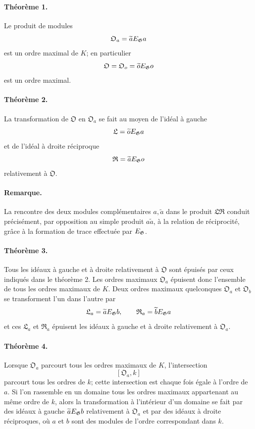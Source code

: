 \paragraph{Théorème 1.}
Le produit de modules
\[
        \mathfrak O_a=\widetilde a E_\mathfrak G a
\]
est un ordre maximal de \(K\); en particulier
\[
        \mathfrak O=\mathfrak O_o=\widetilde oE_\mathfrak G o
\]
est un ordre maximal.

\paragraph{Théorème 2.}
La transformation de \(\mathfrak O\) en \(\mathfrak O_a\) se fait au moyen de l'idéal à gauche
\[
        \mathfrak L=\widetilde oE_\mathfrak G a
\]
et de l'idéal à droite réciproque
\[
        \mathfrak R=\widetilde a E_\mathfrak G o
\]
relativement à \(\mathfrak O\).

\paragraph{Remarque.}
La rencontre des deux modules complémentaires \(a,\widetilde a\) dans le produit \(\mathfrak L\mathfrak R\) conduit précisément, par opposition au simple produit \(a\widetilde a\), à la relation de réciprocité, grâce à la formation de trace effectuée par \(E_\mathfrak G\).

\paragraph{Théorème 3.}
Tous les idéaux à gauche et à droite relativement à \(\mathfrak O\) sont épuisés par ceux indiqués dans le théorème 2. Les ordres maximaux \(\mathfrak O_a\) épuisent donc l'ensemble de tous les ordres maximaux de \(K\). Deux ordres maximaux quelconques \(\mathfrak O_a\) et \(\mathfrak O_b\) se transforment l'un dans l'autre par
\[
        \mathfrak L_a=\widetilde aE_\mathfrak G b,
        \qquad
        \mathfrak R_a=\widetilde bE_\mathfrak G a
\]
et ces \(\mathfrak L_a\) et \(\mathfrak R_a\) épuisent les idéaux à gauche et à droite relativement à \(\mathfrak O_a\).

\paragraph{Théorème 4.}
Lorsque \(\mathfrak O_a\) parcourt tous les ordres maximaux de \(K\), l'intersection
\[
        [\mathfrak O_a,k]
\]
parcourt tous les ordres de \(k\); cette intersection est chaque fois égale à l'ordre de \(a\). Si l'on rassemble en un domaine tous les ordres maximaux appartenant au même ordre de \(k\), alors la transformation à l'intérieur d'un domaine se fait par des idéaux à gauche \(\widetilde aE_\mathfrak G b\) relativement à \(\mathfrak O_a\) et par des idéaux à droite réciproques, où \(a\) et \(b\) sont des modules de l'ordre correspondant dans \(k\).

